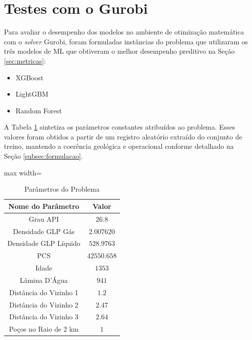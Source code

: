 \section{Testes com o Gurobi}

Para avaliar o desempenho dos modelos no ambiente de otimização matemática com o \textit{solver} Gurobi, foram formuladas instâncias do problema que utilizaram os três modelos de \gls{ML} que obtiveram o melhor desempenho preditivo na Seção \ref{sec:metricas}:

\begin{itemize}
    \item XGBoost
    \item LightGBM
    \item Random Forest
\end{itemize}

A Tabela \ref{tab:parametros} sintetiza os parâmetros constantes atribuídos ao problema. Esses valores foram obtidos a partir de um registro aleatório extraído do conjunto de treino, mantendo a coerência geológica e operacional conforme detalhado na Seção \ref{subsec:formulacao}.

\begin{table}[]
    \centering
    \captionsetup{justification=centering}
    \caption{Parâmetros do Problema}
    \label{tab:parametros}
    \small 
    \setlength{\tabcolsep}{3pt} %
    \begin{adjustbox}{max width=\textwidth}
    \begin{tabular}{cc}
        \toprule
        Nome do Parâmetro & Valor \\
        \midrule
        Grau API & $26.8$ \\
        Densidade GLP Gás & $2.007620$ \\
        Densidade GLP Líquido & $528.9763$ \\
        PCS & $42550.658$ \\
        Idade & $1353$ \\
        Lâmina D'Água & $941$ \\
        Distância do Vizinho 1 & $1.2$ \\
        Distância do Vizinho 2 & $2.47$ \\
        Distância do Vizinho 3 & $2.64$ \\
        Poços no Raio de 2 km & $1$ \\
        \bottomrule
    \end{tabular}
    \end{adjustbox}
\end{table}


